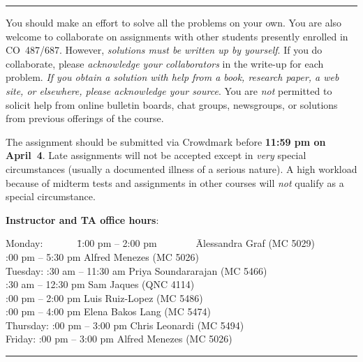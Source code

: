 \documentclass[11pt]{article}
\newcommand{\ZZ}{{\mathbb Z}}
\begin{document}


\hfill\hrule

\newpage
\vspace*{2mm}
\noindent
You should make an effort to solve all the problems on your own.
You are also welcome to collaborate on assignments with other students
presently enrolled in CO~487/687. However, \emph{solutions must be
written up by yourself}. If you do collaborate, please \emph{acknowledge
your collaborators} in the write-up for each problem. \emph{If you
obtain a solution with help from a book, research paper, a web site,
or elsewhere, please acknowledge your source}. You are \emph{not}
permitted to solicit help from online bulletin boards, chat groups,
newsgroups, or solutions from previous offerings of the course.

\vspace*{2mm}
\noindent
The assignment should be submitted via Crowdmark before {\bf 11:59 pm
on April~4}. Late assignments will not be accepted except in
\emph{very} special circumstances (usually a documented illness of
a serious nature). A high workload because of midterm tests and assignments
in other courses will \emph{not} qualify as a special circumstance.

\vspace*{4mm}
\noindent
{\bf Instructor and TA office hours}:
\begin{tabbing}
Monday:~~~~~~~\=1:00 pm -- 2:00 pm~~~~~~~~\= Alessandra Graf (MC 5029)\\
:00 pm -- 5:30 pm \> Alfred Menezes (MC 5026)\\
Tuesday: :30 am -- 11:30 am \> Priya Soundararajan (MC 5466)\\
:30 am -- 12:30 pm \> Sam Jaques (QNC 4114)\\
:00 pm -- 2:00 pm \> Luis Ruiz-Lopez (MC 5486)\\
:00 pm -- 4:00 pm \> Elena Bakos Lang (MC 5474)\\
Thursday: :00 pm -- 3:00 pm \> Chris Leonardi (MC 5494)\\
Friday: :00 pm -- 3:00 pm \> Alfred Menezes (MC 5026)
\end{tabbing}

\hfill\hrule
\end{document}
